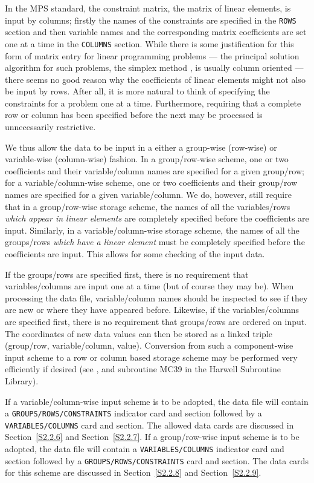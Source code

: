 \documentclass[a4paper]{article}
\begin{document}
In  the MPS
standard,  the  constraint
matrix,   the matrix of linear elements,
is input by  columns;
firstly the  names of the constraints
are specified  in the {\tt  ROWS}
 section and  then variable names
and the corresponding  matrix coefficients are  set one  at a  time in the
{\tt COLUMNS}
section. While there is some justification for this form
of  matrix  entry  for linear programming
problems --- the principal  solution algorithm  for such problems, the
simplex  method  \cite{Dant63}, is usually  column oriented ---  there
seems no good reason why the coefficients of linear elements
might not also  be input by  rows.
After all, it is  more  natural to think of
specifying the constraints
for a  problem one at a time.  Furthermore,
requiring that a complete row or column  has been specified before the
next may be processed is unnecessarily restrictive.

We thus allow the data to be input in a either a group-wise (row-wise)
or  variable-wise (column-wise) fashion.  In  a group/row-wise scheme,
one or two coefficients and their  variable/column names are specified
for a given group/row; for  a  variable/column-wise scheme, one or two
coefficients and their  group/row  names   are specified for   a given
variable/column.  We do, however, still require that in a group/row-wise
storage scheme, the names of all the  variables/rows {\it which appear
in linear elements}
are  completely specified before  the coefficients
are  input.  Similarly,  in a variable/column-wise storage scheme, the
names of all the groups/rows {\it which have a linear element}
must be
completely specified  before the coefficients   are input. This allows
for some checking of the input data.

If the groups/rows are specified first,  there is no  requirement that
variables/columns are input one at a time (but of course they may be).
When   processing  the  data   file, variable/column  names  should be
inspected to see if they  are new or  where they have appeared before.
Likewise,  if the variables/columns are specified  first,  there is no
requirement that groups/rows are ordered on input.  The coordinates of
new data  values can then  be  stored  as  a linked triple (group/row,
variable/column, value).  Conversion from such a  component-wise input
scheme to a row or column based  storage scheme may be performed very
efficiently  if  desired   (see  \cite[pp30--31]{DuffErisReid86}, and
subroutine MC39 in the Harwell Subroutine Library).

If a variable/column-wise input scheme is to be adopted, the data file
will contain a  {\tt GROUPS/\-ROWS/\-CONSTRAINTS}
indicator  card
and section followed by a  {\tt VARIABLES/COLUMNS}
card and section.  The
allowed  data  cards  are   discussed   in    Section~\ref{S2.2.6} and
Section~\ref{S2.2.7}.   If   a group/row-wise  input scheme  is  to be
adopted, the  data   file   will  contain a  {\tt   VARIABLES/COLUMNS}
indicator   card
and section followed by a {\tt GROUPS/\-ROWS/\-CONSTRAINTS}
card  and section.  The data  cards
for  this  scheme are discussed in
Section~\ref{S2.2.8} and Section~\ref{S2.2.9}.
\end{document}
